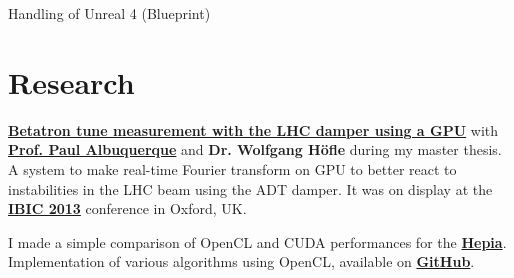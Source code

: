 \documentclass[a4paper]{deedy-resume} %
\begin{document}
\begin{minipage}[t]{0.66\textwidth}
\sectionspace


	\begin{tightitemize}
		\item Handling of Unreal 4 (Blueprint)
	\end{tightitemize}

\sectionspace



\section{Research}

	\textbf{\href{http://cds.cern.ch/record/1545785?ln=en}
		{Betatron tune measurement with the LHC damper using a GPU}}
	with
	\textbf{\href{http://ch.linkedin.com/pub/paul-albuquerque/12/366/809}
		{Prof. Paul Albuquerque}}
	and \textbf{Dr. Wolfgang Höf\/le} during my master thesis.
	A system to make real-time Fourier transform on GPU to better react to instabilities in the LHC 
	beam using the ADT damper. It was on display at the 
	\textbf{\href{http://www.ibic2013.org}{IBIC 2013}} conference in Oxford, UK.

\sectionspace %


	I made a simple comparison of OpenCL and CUDA performances for the 
	\textbf{\href{https://www.hesge.ch/hepia/}{Hepia}}. Implementation of various 
	algorithms using OpenCL, available on
	\textbf{\href{https://github.com/anirul/OpenCL\_PA\_2012}{GitHub}}.

\sectionspace

\end{minipage}%
\hfill%
%
%
\end{document}
